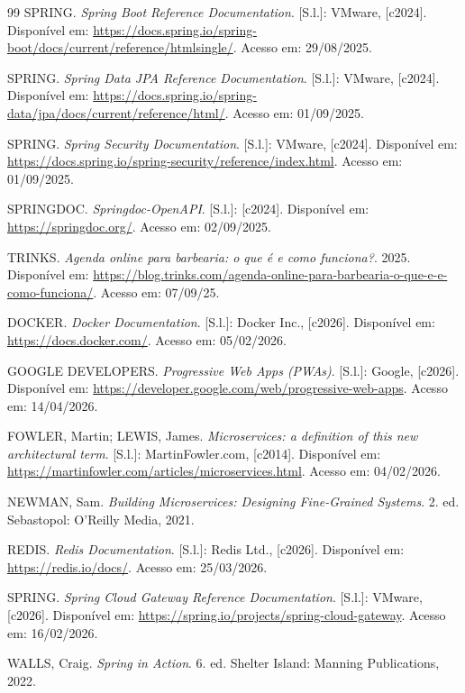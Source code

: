 \documentclass[
    12pt, 
    a4paper, 
    oneside, 
    chapter=TITLE, 
    section=TITLE
]{abntex2}
\begin{document}
\begin{thebibliography}{99}
    SPRING. \textit{Spring Boot Reference Documentation}. [S.l.]: VMware, [c2024]. Disponível em: \url{https://docs.spring.io/spring-boot/docs/current/reference/htmlsingle/}. Acesso em: 29/08/2025.

    SPRING. \textit{Spring Data JPA Reference Documentation}. [S.l.]: VMware, [c2024]. Disponível em: \url{https://docs.spring.io/spring-data/jpa/docs/current/reference/html/}. Acesso em: 01/09/2025.

    SPRING. \textit{Spring Security Documentation}. [S.l.]: VMware, [c2024]. Disponível em: \url{https://docs.spring.io/spring-security/reference/index.html}. Acesso em: 01/09/2025.

    SPRINGDOC. \textit{Springdoc-OpenAPI}. [S.l.]: [c2024]. Disponível em: \url{https://springdoc.org/}. Acesso em: 02/09/2025.

    TRINKS. \textit{Agenda online para barbearia: o que é e como funciona?}. 2025. Disponível em: \url{https://blog.trinks.com/agenda-online-para-barbearia-o-que-e-e-como-funciona/}. Acesso em: 07/09/25.

    DOCKER. \textit{Docker Documentation}. [S.l.]: Docker Inc., [c2026]. Disponível em: \url{https://docs.docker.com/}. Acesso em: 05/02/2026.

    GOOGLE DEVELOPERS. \textit{Progressive Web Apps (PWAs)}. [S.l.]: Google, [c2026]. Disponível em: \url{https://developer.google.com/web/progressive-web-apps}. Acesso em: 14/04/2026.

    FOWLER, Martin; LEWIS, James. \textit{Microservices: a definition of this new architectural term}. [S.l.]: MartinFowler.com, [c2014]. Disponível em: \url{https://martinfowler.com/articles/microservices.html}. Acesso em: 04/02/2026.

    NEWMAN, Sam. \textit{Building Microservices: Designing Fine-Grained Systems}. 2. ed. Sebastopol: O'Reilly Media, 2021.

    REDIS. \textit{Redis Documentation}. [S.l.]: Redis Ltd., [c2026]. Disponível em: \url{https://redis.io/docs/}. Acesso em: 25/03/2026.

    SPRING. \textit{Spring Cloud Gateway Reference Documentation}. [S.l.]: VMware, [c2026]. Disponível em: \url{https://spring.io/projects/spring-cloud-gateway}. Acesso em: 16/02/2026.

    WALLS, Craig. \textit{Spring in Action}. 6. ed. Shelter Island: Manning Publications, 2022.
\end{thebibliography}
\end{document}
